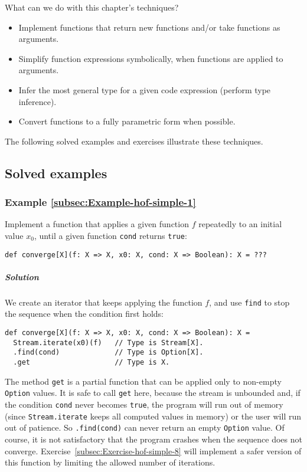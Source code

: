 What can we do with this chapter\textsf{'}s techniques?
\begin{itemize}
\item Implement functions that return new functions and/or take functions
as arguments.
\item Simplify function expressions symbolically, when functions are applied
to arguments.
\item Infer the most general type for a given code expression (perform type
inference).
\item Convert functions to a fully parametric form when possible.
\end{itemize}
The following solved examples and exercises illustrate these techniques.

\subsection{Solved examples}

\subsubsection{Example \label{subsec:Example-hof-simple-1}\ref{subsec:Example-hof-simple-1}}

Implement a function that applies a given function $f$ repeatedly
to an initial value $x_{0}$, until a given function \lstinline!cond!
returns \lstinline!true!:
\begin{lstlisting}
def converge[X](f: X => X, x0: X, cond: X => Boolean): X = ???
\end{lstlisting}


\subparagraph{Solution}

We create an iterator that keeps applying the function $f$, and use
\lstinline!find! to stop the sequence when the condition first holds:
\begin{lstlisting}
def converge[X](f: X => X, x0: X, cond: X => Boolean): X = 
  Stream.iterate(x0)(f)   // Type is Stream[X].
  .find(cond)             // Type is Option[X].
  .get                    // Type is X.
\end{lstlisting}
The method \lstinline!get! is a partial
function that can be applied only to non-empty \lstinline!Option!
values. It is safe to call \lstinline!get! here, because the stream
is unbounded and, if the condition \lstinline!cond! never becomes
\lstinline!true!, the program will run out of memory (since \lstinline!Stream.iterate!
keeps all computed values in memory) or the user will run out of patience.
So \lstinline!.find(cond)! can never return an empty \lstinline!Option!
value. Of course, it is not satisfactory that the program crashes
when the sequence does not converge. Exercise~\ref{subsec:Exercise-hof-simple-8}
will implement a safer version of this function by limiting the allowed
number of iterations.

